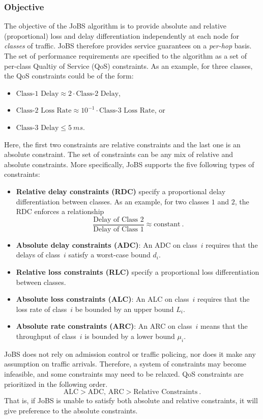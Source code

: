 \subsubsection{Objective}
The objective of the JoBS algorithm is to provide absolute and
relative (proportional) loss and delay differentiation independently
at each node for {\em classes} of traffic. JoBS therefore provides
service guarantees on a {\em per-hop} basis.  The set of performance
requirements are specified to the algorithm as a set of per-class
Qualtiy of Service (QoS) constraints.  As an example, for three
classes, the QoS constraints could be of the form:
\begin{itemize}
\item{$\mbox{Class-1 Delay} \approx 2 \cdot  \mbox{Class-2 Delay}$}, 
\item{$\mbox{Class-2 Loss Rate}  \approx 10^{-1} \cdot\mbox{Class-3 Loss Rate}$, or} 
\item{$\mbox{Class-3 Delay} \leq 5~ms$.} 
\end{itemize}
Here, the first two constraints are relative constraints and the last 
one is an absolute constraint. The set of constraints can be 
any mix of relative and absolute constraints. 
More specifically, JoBS supports the five following types of constraints:
\begin{itemize}
\item{{\bf Relative delay constraints (RDC)} specify a proportional 
delay differentiation between classes. As an example, for two classes $1$ and $2$, the RDC enforces a relationship
\[
\frac{\mbox{Delay of Class 2}}{\mbox{Delay of Class 1}}\approx \mbox{constant}\ .\nonumber
\]
}
\item{{\bf Absolute delay constraints (ADC)}: An ADC on class~$i$ requires that the delays of class~$i$ satisfy a worst-case bound $d_i$.}
\item{{\bf Relative loss constraints (RLC)} specify a proportional 
loss differentiation between classes.}
\item{{\bf Absolute loss constraints (ALC)}: An ALC on class~$i$ requires that the loss rate of class~$i$ be bounded by an upper bound $L_i$.}
\item{{\bf Absolute rate constraints (ARC)}: An ARC on class~$i$ means that the throughput of class~$i$ is bounded by a lower bound $\mu_i$.}
\end{itemize}

JoBS does not rely on admission control or traffic policing, nor does it 
make any assumption on traffic arrivals. 
Therefore, a system of constraints may become infeasible, and 
some constraints may need to be relaxed. 
QoS constraints are prioritized in the following order.
\[ 
\mbox{ALC} > \mbox{ADC, ARC} > \mbox{Relative Constraints} \ .
\]
That is, if JoBS is unable to satisfy both absolute and relative constraints, 
it will give preference to the absolute constraints.

